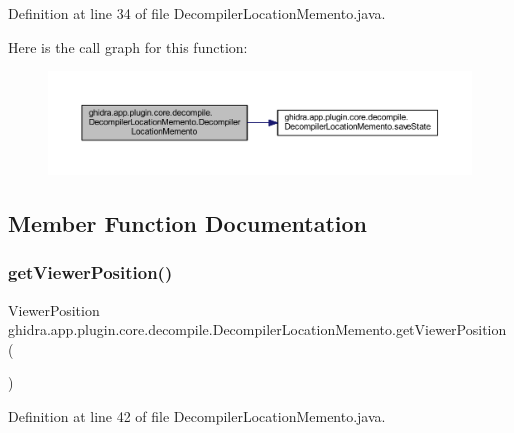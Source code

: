 Definition at line 34 of file Decompiler\+Location\+Memento.\+java.

Here is the call graph for this function\+:
\nopagebreak
\begin{figure}[H]
\begin{center}
\leavevmode
\includegraphics[width=350pt]{classghidra_1_1app_1_1plugin_1_1core_1_1decompile_1_1_decompiler_location_memento_aee736638d1946c497944955f90577efb_cgraph}
\end{center}
\end{figure}


\subsection{Member Function Documentation}
\mbox{\label{classghidra_1_1app_1_1plugin_1_1core_1_1decompile_1_1_decompiler_location_memento_af8a3b0a5ae9e837634f352233b0d56e9}} 
\subsubsection{\texorpdfstring{getViewerPosition()}{getViewerPosition()}}
{\footnotesize\ttfamily Viewer\+Position ghidra.\+app.\+plugin.\+core.\+decompile.\+Decompiler\+Location\+Memento.\+get\+Viewer\+Position (\begin{DoxyParamCaption}{ }\end{DoxyParamCaption})\hspace{0.3cm}{\ttfamily [inline]}}



Definition at line 42 of file Decompiler\+Location\+Memento.\+java.

